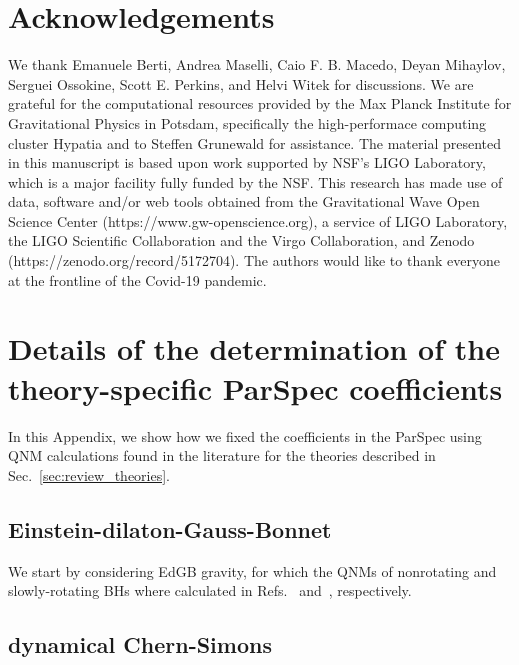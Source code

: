 \documentclass[twocolumn,
               prd,
               aps,
               superscriptaddress,
               tightenlines,
               nofootinbib,
               eqsecnum,
               amsfonts,
               amsmath,
               longbibliography]{revtex4-1}
\newcommand{\agcomm}[1]{{\textcolor{red}{{[AG: #1]}} }}
\begin{document}
\section*{Acknowledgements}
\label{sec:acknowledgements}
%
We thank Emanuele Berti, Andrea Maselli, Caio F. B. Macedo, Deyan Mihaylov,
Serguei Ossokine, Scott E. Perkins, and Helvi Witek for discussions.
%
We are grateful for the computational resources provided by the Max Planck
Institute for Gravitational Physics in Potsdam, specifically the
high-performace computing cluster Hypatia and to Steffen Grunewald for
assistance.
%
The material presented in this manuscript is based upon work supported by NSF’s LIGO Laboratory,
which is a major facility fully funded by the NSF.
%
This research has made use of data, software and/or web tools obtained from the Gravitational Wave Open
Science Center (https://www.gw-openscience.org), a service of LIGO Laboratory, the LIGO Scientific Collaboration
and the Virgo Collaboration, and Zenodo (https://zenodo.org/record/5172704).
%
The authors would like to thank everyone at the frontline of the Covid-19
pandemic.

\appendix

\section{Details of the determination of the theory-specific ParSpec coefficients}
\label{app:map_details}


In this Appendix, we show how we fixed the coefficients in the ParSpec using
QNM calculations found in the literature for the theories described in
Sec.~\ref{sec:review_theories}.

\subsection{Einstein-dilaton-Gauss-Bonnet}
\label{app:map_edgb}

We start by considering EdGB gravity, for which the QNMs of nonrotating and
slowly-rotating BHs where calculated in
Refs.~\cite{Pani:2009wy,Blazquez-Salcedo:2016enn} and~\cite{Pierini:2021jxd},
respectively.

\subsection{dynamical Chern-Simons}
\label{app:map_dcs}
\end{document}
